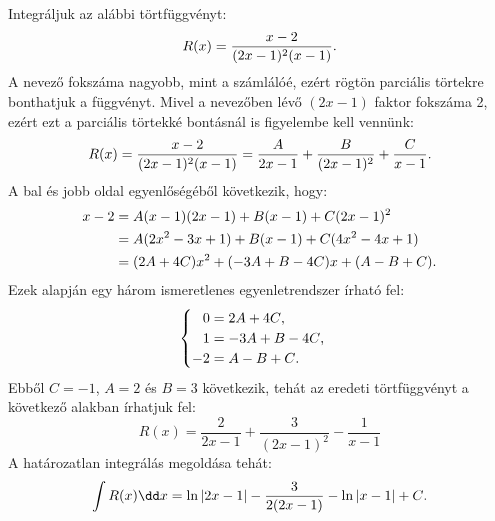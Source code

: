 \clearpage

\begin{example}
  Integráljuk az alábbi törtfüggvényt:
  \[
    R(x) = \frac{x - 2}{(2x - 1)^2 (x - 1)}
    \text.
  \]
  A nevező fokszáma nagyobb, mint a számlálóé, ezért rögtön parciális törtekre
  bonthatjuk a függvényt. Mivel a nevezőben lévő $(2x - 1)$ faktor fokszáma 2,
  ezért ezt a parciális törtekké bontásnál is figyelembe kell vennünk:
  \[
    R(x)
    = \frac{x - 2}{(2x - 1)^2 (x - 1)}
    = \frac{A}{2x - 1} + \frac{B}{(2x - 1)^2} + \frac{C}{x - 1}
    \text.
  \]
  A bal és jobb oldal egyenlőségéből következik, hogy:
  \begin{align*}
    x - 2
     & = A(x - 1)(2x - 1) + B(x - 1) + C(2x - 1)^2
    \\
     & = A(2 x^2 - 3 x + 1) + B(x - 1) + C (4x^2 - 4 x + 1)
    \\
     & = (2A + 4C) x^2 + (-3A + B - 4C) x + (A - B + C)
    \text.
  \end{align*}
  Ezek alapján egy három ismeretlenes egyenletrendszer írható fel:
  \[
    \begin{cases}
      \phantom-0 = 2 A + 4 C \text,    \\
      \phantom-1 = -3A + B - 4C \text, \\
      -2 = A - B + C \text.
    \end{cases}
  \]
  Ebből $C = -1$, $A = 2$ és $B = 3$ következik, tehát az eredeti törtfüggvényt
  a következő alakban írhatjuk fel:
  \[
    R(x) = \frac{2}{2x - 1} + \frac{3}{(2x - 1)^2} - \frac{1}{x - 1}
  \]
  A határozatlan integrálás megoldása tehát:
  \[
    \int R(x) \dd x
    = \ln |2x - 1| - \frac{3}{2(2x - 1)} - \ln |x - 1| + C
    \text.
  \]
\end{example}

